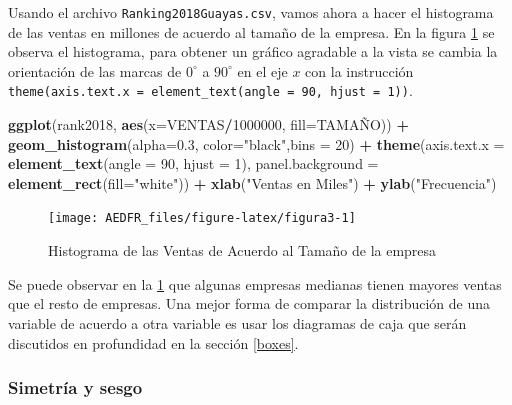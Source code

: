 \documentclass[letterpaper,]{book}
\newenvironment{Shaded}{\begin{snugshade}}{\end{snugshade}}
\newcommand{\DataTypeTok}[1]{\textcolor[rgb]{0.13,0.29,0.53}{#1}}
\newcommand{\DecValTok}[1]{\textcolor[rgb]{0.00,0.00,0.81}{#1}}
\newcommand{\FloatTok}[1]{\textcolor[rgb]{0.00,0.00,0.81}{#1}}
\newcommand{\KeywordTok}[1]{\textcolor[rgb]{0.13,0.29,0.53}{\textbf{#1}}}
\newcommand{\NormalTok}[1]{#1}
\newcommand{\OperatorTok}[1]{\textcolor[rgb]{0.81,0.36,0.00}{\textbf{#1}}}
\newcommand{\StringTok}[1]{\textcolor[rgb]{0.31,0.60,0.02}{#1}}
\begin{document}
Usando el archivo \texttt{Ranking2018Guayas.csv}, vamos ahora a hacer el histograma de las ventas en millones de acuerdo al tamaño de la empresa. En la figura \ref{fig:figura3} se observa el histograma, para obtener un gráfico agradable a la vista se cambia la orientación de las marcas de \(0^\circ\) a \(90^\circ\) en el eje \(x\) con la instrucción \texttt{theme(axis.text.x\ =\ element\_text(angle\ =\ 90,\ hjust\ =\ 1))}.

\begin{Shaded}
\begin{Highlighting}[]
\KeywordTok{ggplot}\NormalTok{(rank2018, }\KeywordTok{aes}\NormalTok{(}\DataTypeTok{x=}\NormalTok{VENTAS}\OperatorTok{/}\DecValTok{1000000}\NormalTok{, }\DataTypeTok{fill=}\NormalTok{TAMAÑO)) }\OperatorTok{+}\StringTok{ }
\StringTok{  }\KeywordTok{geom_histogram}\NormalTok{(}\DataTypeTok{alpha=}\FloatTok{0.3}\NormalTok{, }\DataTypeTok{color=}\StringTok{"black"}\NormalTok{,}\DataTypeTok{bins =} \DecValTok{20}\NormalTok{) }\OperatorTok{+}
\StringTok{  }\KeywordTok{theme}\NormalTok{(}\DataTypeTok{axis.text.x =} \KeywordTok{element_text}\NormalTok{(}\DataTypeTok{angle =} \DecValTok{90}\NormalTok{, }\DataTypeTok{hjust =} \DecValTok{1}\NormalTok{), }
        \DataTypeTok{panel.background =} \KeywordTok{element_rect}\NormalTok{(}\DataTypeTok{fill=}\StringTok{"white"}\NormalTok{)) }\OperatorTok{+}
\StringTok{  }\KeywordTok{xlab}\NormalTok{(}\StringTok{"Ventas en Miles"}\NormalTok{) }\OperatorTok{+}\StringTok{ }\KeywordTok{ylab}\NormalTok{(}\StringTok{"Frecuencia"}\NormalTok{) }
\end{Highlighting}
\end{Shaded}

\begin{figure}[h!]

{\centering \texttt{[image: AEDFR\_files/figure-latex/figura3-1]} 

}

\caption{Histograma de las Ventas de Acuerdo al Tamaño de la empresa}\label{fig:figura3}
\end{figure}

Se puede observar en la \ref{fig:figura3} que algunas empresas medianas tienen mayores ventas que el resto de empresas. Una mejor forma de comparar la distribución de una variable de acuerdo a otra variable es usar los diagramas de caja que serán discutidos en profundidad en la sección \ref{boxes}.

\hypertarget{simetria-y-sesgo}{%
\subsubsection{Simetría y sesgo}\label{simetria-y-sesgo}}
\end{document}
